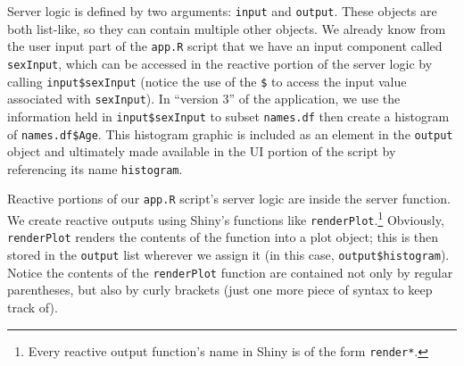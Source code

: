 \documentclass[
]{krantz}
\begin{document}
Server logic is defined by two arguments: \texttt{input} and \texttt{output}. These objects are both list-like, so they can contain multiple other objects. We already know from the user input part of the \texttt{app.R} script that we have an input component called \texttt{sexInput}, which can be accessed in the reactive portion of the server logic by calling \texttt{input\$sexInput} (notice the use of the \texttt{\$} to access the input value associated with \texttt{sexInput}). In ``version 3'' of the application, we use the information held in \texttt{input\$sexInput} to subset \texttt{names.df} then create a histogram of \texttt{names.df\$Age}. This histogram graphic is included as an element in the \texttt{output} object and ultimately made available in the UI portion of the script by referencing its name \texttt{histogram}.

Reactive portions of our \texttt{app.R} script's server logic are inside the server function. We create reactive outputs using Shiny's functions like \texttt{renderPlot}.\footnote{Every reactive output function's name in Shiny is of the form \texttt{render*}.} Obviously, \texttt{renderPlot} renders the contents of the function into a plot object; this is then stored in the \texttt{output} list wherever we assign it (in this case, \texttt{output\$histogram}). Notice the contents of the \texttt{renderPlot} function are contained not only by regular parentheses, but also by curly brackets (just one more piece of syntax to keep track of).
\end{document}
